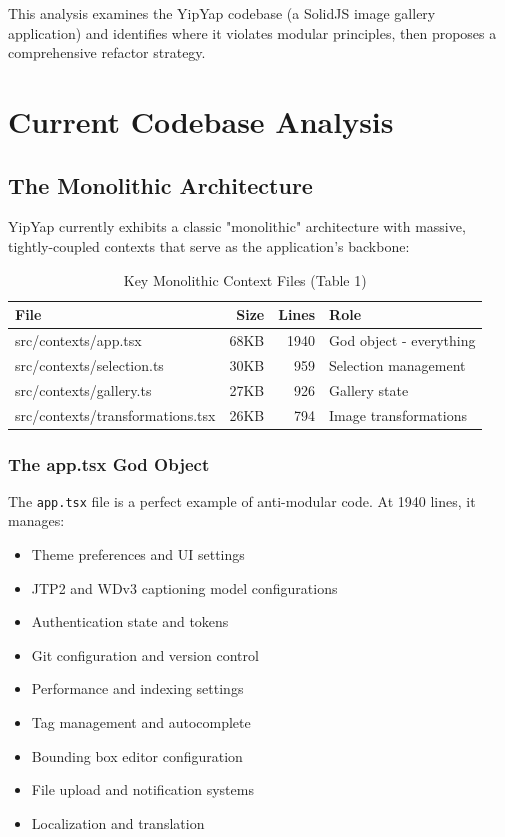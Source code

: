 \documentclass[11pt]{article}
\begin{document}
This analysis examines the YipYap codebase (a SolidJS image gallery application) and identifies where it violates modular principles, then proposes a comprehensive refactor strategy.

\section{Current Codebase Analysis}

\subsection{The Monolithic Architecture}

YipYap currently exhibits a classic "monolithic" architecture with massive, tightly-coupled contexts that serve as the application's backbone:

\begin{table}[h]
\centering
\begin{tabular}{|l|r|r|l|}
\hline
\textbf{File} & \textbf{Size} & \textbf{Lines} & \textbf{Role} \\
\hline
src/contexts/app.tsx & 68KB & 1940 & God object - everything \\
src/contexts/selection.ts & 30KB & 959 & Selection management \\
src/contexts/gallery.ts & 27KB & 926 & Gallery state \\
src/contexts/transformations.tsx & 26KB & 794 & Image transformations \\
\hline
\end{tabular}
\caption{Key Monolithic Context Files (Table 1)}
\end{table}
\label{table:monolithic-contexts}

\subsubsection{The app.tsx God Object}

The \texttt{app.tsx} file is a perfect example of anti-modular code. At 1940 lines, it manages:

\begin{itemize}
\item Theme preferences and UI settings
\item JTP2 and WDv3 captioning model configurations  
\item Authentication state and tokens
\item Git configuration and version control
\item Performance and indexing settings
\item Tag management and autocomplete
\item Bounding box editor configuration
\item File upload and notification systems
\item Localization and translation
\end{itemize}
\end{document}
